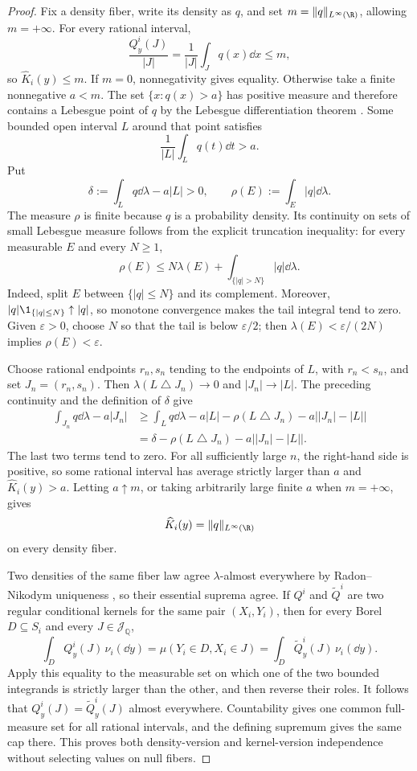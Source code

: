 \begin{proof}
Fix a density fiber, write its density as $q$, and set
$m=\|q\|_{L^\infty(\R)}$, allowing $m=+\infty$.  For every rational interval,
\[
\frac{Q^i_y(J)}{|J|}=\frac1{|J|}\int_Jq(x)\dd x\leq m,
\]
so $\widehat K_i(y)\leq m$.  If $m=0$, nonnegativity gives equality.
Otherwise take a finite nonnegative $a<m$.  The set $\{x:q(x)>a\}$ has
positive measure and therefore contains a Lebesgue point of $q$ by the
Lebesgue differentiation theorem \citep[Chapter~3]{Folland1999}.  Some
bounded open interval $L$ around that point satisfies
\[
\frac1{|L|}\int_Lq(t)\dd t>a.
\]
Put
\[
\delta:=\int_Lq\dd\lambda-a|L|>0,
\qquad
\rho(E):=\int_E|q|\dd\lambda.
\]
The measure $\rho$ is finite because $q$ is a probability density.  Its
continuity on sets of small Lebesgue measure follows from the explicit
truncation inequality: for every measurable $E$ and every $N\geq1$,
\[
\rho(E)
\leq N\lambda(E)+\int_{\{|q|>N\}}|q|\dd\lambda.
\]
Indeed, split $E$ between $\{|q|\leq N\}$ and its complement.  Moreover,
$|q|\1_{\{|q|\leq N\}}\uparrow|q|$, so monotone convergence
\citep[Chapter~2]{Folland1999} makes the tail integral tend to zero.  Given
$\varepsilon>0$, choose $N$ so that the tail is below $\varepsilon/2$; then
$\lambda(E)<\varepsilon/(2N)$ implies $\rho(E)<\varepsilon$.

Choose rational endpoints $r_n,s_n$ tending to the endpoints of $L$, with
$r_n<s_n$, and set $J_n=(r_n,s_n)$.  Then
$\lambda(L\mathbin\triangle J_n)\to0$ and $|J_n|\to|L|$.  The preceding
continuity and the definition of $\delta$ give
\[
\begin{aligned}
\int_{J_n}q\dd\lambda-a|J_n|
&\geq \int_Lq\dd\lambda-a|L|
 -\rho(L\mathbin\triangle J_n)-a\bigl||J_n|-|L|\bigr|\\
&=\delta-\rho(L\mathbin\triangle J_n)
 -a\bigl||J_n|-|L|\bigr|.
\end{aligned}
\]
The last two terms tend to zero.  For all sufficiently large $n$, the
right-hand side is positive, so some rational interval has average strictly
larger than $a$ and $\widehat K_i(y)>a$.  Letting $a\uparrow m$, or taking
arbitrarily large finite $a$ when $m=+\infty$, gives
\begin{equation}
\widehat K_i(y)=\|q\|_{L^\infty(\R)}
\label{eq:rational-cap-identity}
\end{equation}
on every density fiber.

Two densities of the same fiber law agree $\lambda$-almost everywhere by
Radon--Nikodym uniqueness \citep[Chapter~3]{Folland1999}, so their essential
suprema agree.  If $Q^i$ and $\widetilde Q^i$ are two regular conditional
kernels for the same pair $(X_i,Y_i)$, then for every Borel
$D\subseteq S_i$ and every $J\in\mathscr J_{\mathbb Q}$,
\[
\int_DQ^i_y(J)\,\nu_i(\dd y)
=\mu(Y_i\in D,X_i\in J)
=\int_D\widetilde Q^i_y(J)\,\nu_i(\dd y).
\]
Apply this equality to the measurable set on which one of the two bounded
integrands is strictly larger than the other, and then reverse their roles.
It follows that $Q^i_y(J)=\widetilde Q^i_y(J)$ almost everywhere.  Countability
gives one common full-measure set for all rational intervals, and the defining
supremum gives the same cap there.  This proves both density-version and
kernel-version independence without selecting values on null fibers.


\end{proof}
